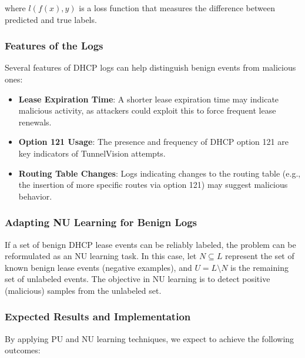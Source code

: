 \documentclass[conference]{IEEEtran}
\begin{document}
            where \(l(f(x), y)\) is a loss function that measures the difference between predicted and true labels.
            
        \subsubsection{Features of the Logs}
        
            Several features of DHCP logs can help distinguish benign events from malicious ones:
            
            \begin{itemize}
                \item \textbf{Lease Expiration Time}: A shorter lease expiration time may indicate malicious activity, as attackers could exploit this to force frequent lease renewals.
                \item \textbf{Option 121 Usage}: The presence and frequency of DHCP option 121 are key indicators of TunnelVision attempts.
                \item \textbf{Routing Table Changes}: Logs indicating changes to the routing table (e.g., the insertion of more specific routes via option 121) may suggest malicious behavior.
            \end{itemize}
        
        \subsubsection{Adapting NU Learning for Benign Logs}
        
            If a set of benign DHCP lease events can be reliably labeled, the problem can be reformulated as an NU learning task. In this case, let \(N \subseteq L\) represent the set of known benign lease events (negative examples), and \(U = L \setminus N\) is the remaining set of unlabeled events. The objective in NU learning is to detect positive (malicious) samples from the unlabeled set.
        
        \subsubsection{Expected Results and Implementation}
        
            By applying PU and NU learning techniques, we expect to achieve the following outcomes:
            
\end{document}
